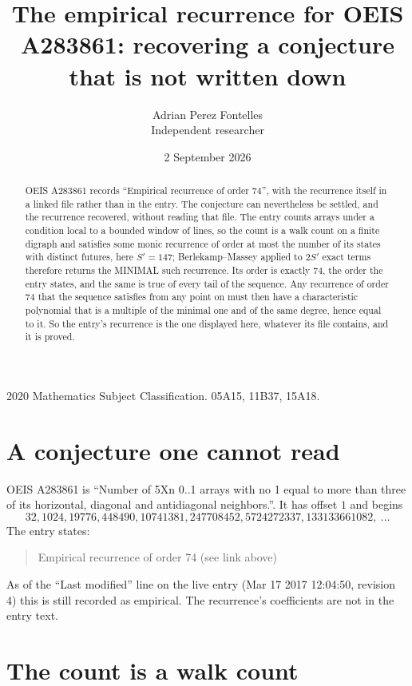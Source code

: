 \documentclass[11pt,a4paper]{article}
\title{The empirical recurrence for OEIS A283861: recovering a conjecture that is not written down}
\author{Adrian Perez Fontelles\\ \small Independent researcher}
\date{2 September 2026}
\theoremstyle{plain}
\theoremstyle{definition}
\begin{document}
\maketitle

\begin{abstract}
OEIS A283861 records ``Empirical recurrence of order $74$'', with the recurrence itself in a
linked file rather than in the entry. The conjecture can nevertheless be settled, and the
recurrence recovered, without reading that file. The entry counts arrays under a condition
local to a bounded window of lines, so the count is a walk count on a finite digraph and
satisfies some monic recurrence of order at most the number of its states with distinct
futures, here $S'=147$; Berlekamp--Massey applied to $2S'$ exact
terms therefore returns the MINIMAL such recurrence. Its order is exactly $74$, the order
the entry states, and the same is true of every tail of the sequence. Any recurrence of order
$74$ that the sequence satisfies from any point on must then have a characteristic
polynomial that is a multiple of the minimal one and of the same degree, hence equal to it. So
the entry's recurrence is the one displayed here, whatever its file contains, and it is
proved.
\end{abstract}

\noindent\small 2020 Mathematics Subject Classification. 05A15, 11B37, 15A18.\normalsize

\section{A conjecture one cannot read}

OEIS A283861 is ``Number of 5Xn 0..1 arrays with no 1 equal to more than three of its horizontal, diagonal and antidiagonal neighbors.''. It has offset $1$ and begins
\[
32, 1024, 19776, 448490, 10741381, 247708452, 5724272337, 133133661082,\ \dots
\]
The entry states:
\begin{quote}
Empirical recurrence of order 74 (see link above)
\end{quote}
As of the ``Last modified'' line on the live entry (Mar 17 2017 12:04:50, revision 4) this is still
recorded as empirical. The recurrence's coefficients are not in the entry text.

\section{The count is a walk count}
\end{document}

